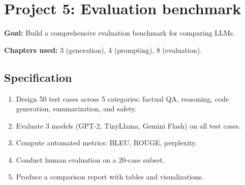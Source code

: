 \section{Project 5: Evaluation benchmark}

\textbf{Goal:} Build a comprehensive evaluation benchmark for comparing LLMs.

\textbf{Chapters used:} 3 (generation), 4 (prompting), 8 (evaluation).

\subsection{Specification}

\begin{enumerate}
  \item Design 50 test cases across 5 categories: factual QA, reasoning, code generation, summarization, and safety.
  \item Evaluate 3 models (GPT-2, TinyLlama, Gemini Flash) on all test cases.
  \item Compute automated metrics: BLEU, ROUGE, perplexity.
  \item Conduct human evaluation on a 20-case subset.
  \item Produce a comparison report with tables and visualizations.
\end{enumerate}

